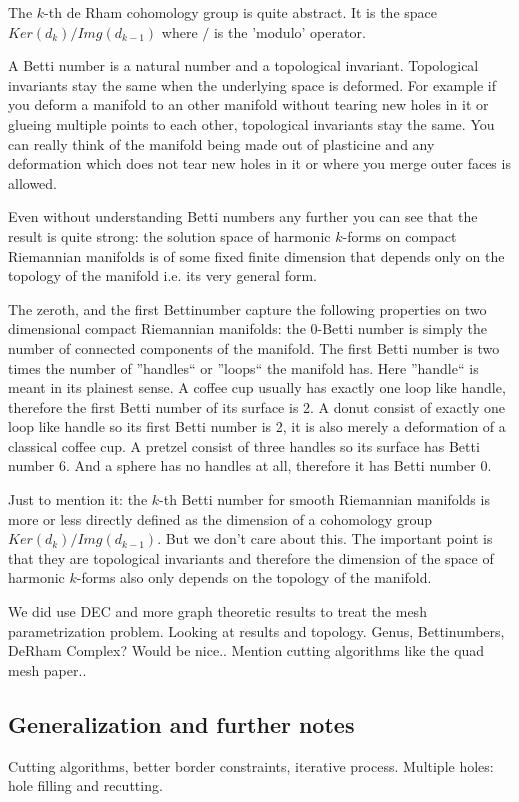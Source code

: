 The $k$-th de Rham cohomology group is quite abstract. It is the space $Ker(d_k)/Img(d_{k-1})$ where $/$ is the 'modulo' operator. 

A Betti number is a natural number and a topological invariant. Topological invariants stay the same when the underlying space is deformed. For example if you deform a manifold to an other manifold without tearing new holes in it or glueing multiple points to each other, topological invariants stay the same. You can really think of the manifold being made out of plasticine and any deformation which does not tear new holes in it or where you merge outer faces is allowed. 

Even without understanding Betti numbers any further you can see that the result is quite strong: the solution space of harmonic $k$-forms on compact Riemannian manifolds is of some fixed finite dimension that depends only on the topology of the manifold i.e. its very general form. 

The zeroth, and the first Bettinumber capture the following properties on two dimensional compact Riemannian manifolds: the 0-Betti number is simply the number of connected components of the manifold. The first Betti number is two times the number of ''handles`` or ''loops`` the manifold has. Here ''handle`` is meant in its plainest sense. A coffee cup usually has exactly one loop like handle, therefore the first Betti number of its surface is 2. A donut consist of exactly one loop like handle so its first Betti number is 2, it is also merely a deformation of a classical coffee cup. A pretzel consist of three handles so its surface has Betti number 6. And a sphere has no handles at all, therefore it has Betti number 0. 


Just to mention it: the $k$-th Betti number for smooth Riemannian manifolds is more or less directly defined as the dimension of a cohomology group $Ker(d_k)/Img(d_{k-1})$. But we don't care about this. The important point is that they are topological invariants and therefore the dimension of the space of harmonic $k$-forms also only depends on the topology of the manifold.




We did use DEC and more graph theoretic results to treat the mesh parametrization problem. 
		Looking at results and topology. Genus, Bettinumbers, DeRham Complex?	Would be nice..
		Mention cutting algorithms like the quad mesh paper..
		
\subsection{Generalization and further notes}
Cutting algorithms, better border constraints, iterative process. Multiple holes: hole filling and recutting.